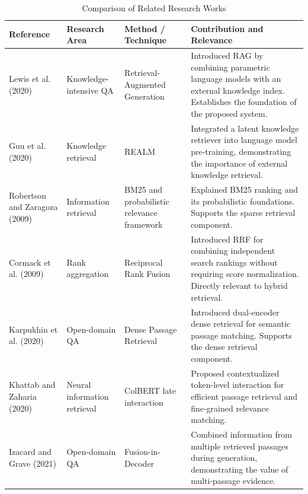 \documentclass[conference]{IEEEtran}
\begin{document}
\begin{table}[!t]
\centering
\caption{Comparison of Related Research Works}
\label{tab:literature_comparison}

\scriptsize
\renewcommand{\arraystretch}{1.16}
\setlength{\tabcolsep}{3pt}

\begin{tabularx}{\textwidth}{
    L{2.25cm}
    L{2.55cm}
    L{3.15cm}
    Y
}
\toprule
\textbf{Reference} &
\textbf{Research Area} &
\textbf{Method / Technique} &
\textbf{Contribution and Relevance} \\
\midrule

Lewis et al. (2020) \cite{Lewis2020} &
Knowledge-intensive QA &
Retrieval-Augmented Generation &
Introduced RAG by combining parametric language models with an external knowledge index. Establishes the foundation of the proposed system. \\

Guu et al. (2020) \cite{REALM2020} &
Knowledge retrieval &
REALM &
Integrated a latent knowledge retriever into language model pre-training, demonstrating the importance of external knowledge retrieval. \\

Robertson and Zaragoza (2009) \cite{Robertson2009} &
Information retrieval &
BM25 and probabilistic relevance framework &
Explained BM25 ranking and its probabilistic foundations. Supports the sparse retrieval component. \\

Cormack et al. (2009) \cite{Cormack2009} &
Rank aggregation &
Reciprocal Rank Fusion &
Introduced RRF for combining independent search rankings without requiring score normalization. Directly relevant to hybrid retrieval. \\

Karpukhin et al. (2020) \cite{Karpukhin2020} &
Open-domain QA &
Dense Passage Retrieval &
Introduced dual-encoder dense retrieval for semantic passage matching. Supports the dense retrieval component. \\

Khattab and Zaharia (2020) \cite{ColBERT2020} &
Neural information retrieval &
ColBERT late interaction &
Proposed contextualized token-level interaction for efficient passage retrieval and fine-grained relevance matching. \\

Izacard and Grave (2021) \cite{FiD2021} &
Open-domain QA &
Fusion-in-Decoder &
Combined information from multiple retrieved passages during generation, demonstrating the value of multi-passage evidence. \\


\end{tabularx}
\end{table}
\end{document}
